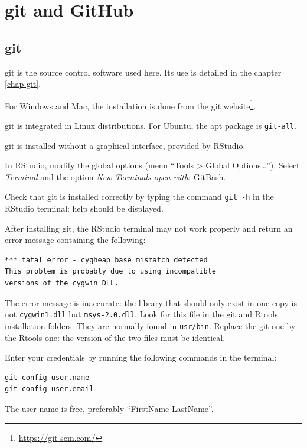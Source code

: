 \documentclass[
  12pt,
  american,
  a4paper,
  extrafontsizes,onecolumn,openright
  ]{memoir}
\newlength{\rf}
\begin{document}
\section{git and GitHub}\label{git-and-github}

\subsection{git}\label{git}

git is the source control software used here.
Its use is detailed in the chapter \ref{chap-git}.

For Windows and Mac, the installation is done from the git website\footnote{\url{https://git-scm.com/}}.

git is integrated in Linux distributions.
For Ubuntu, the apt package is \texttt{git-all}.

git is installed without a graphical interface, provided by RStudio.

In RStudio, modify the global options (menu \enquote{Tools \textgreater{} Global Options\ldots{}}).
Select \emph{Terminal} and the option \emph{New Terminals open with}: GitBash.

Check that git is installed correctly by typing the command \texttt{git\ -h} in the RStudio terminal: help should be displayed.

After installing git, the RStudio terminal may not work properly and return an error message containing the following:

\begin{verbatim}
*** fatal error - cygheap base mismatch detected
This problem is probably due to using incompatible 
versions of the cygwin DLL.
\end{verbatim}

The error message is inaccurate: the library that should only exist in one copy is not \texttt{cygwin1.dll} but \texttt{msys-2.0.dll}.
Look for this file in the git and Rtools installation folders.
They are normally found in \texttt{usr/bin}.
Replace the git one by the Rtools one: the version of the two files must be identical.

Enter your credentials by running the following commands in the terminal:

\begin{verbatim}
git config user.name
git config user.email
\end{verbatim}

The user name is free, preferably \enquote{FirstName LastName}.
\end{document}
